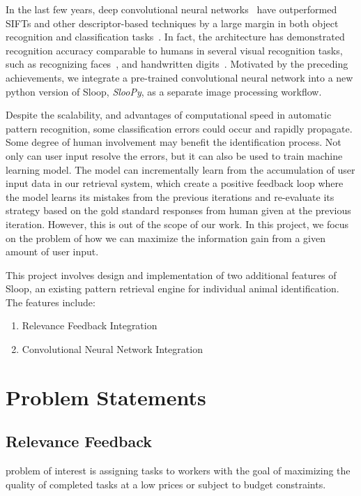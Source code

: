 In the last few years, deep convolutional neural networks~\cite{lecun95,
kriz12} have outperformed SIFTs and other descriptor-based techniques by a
large margin in both object recognition and classification tasks~\cite{kriz12,
fisher14, ILSVRC15}. In fact, the architecture has demonstrated recognition
accuracy comparable to humans in several visual recognition tasks, such as
recognizing faces~\cite{deepface14}, and handwritten digits~\cite{mnist13}.
Motivated by the preceding achievements, we integrate a pre-trained
convolutional neural network into a new python version of Sloop, \emph{SlooPy},
as a separate image processing workflow.

Despite the scalability, and advantages of computational speed in automatic
pattern recognition, some classification errors could occur and rapidly
propagate. Some degree of human involvement may benefit the identification
process. Not only can user input resolve the errors, but it can also be used to
train machine learning model. The model can incrementally learn from the
accumulation of user input data in our retrieval system, which create a
positive feedback loop where the model learns its mistakes from the previous
iterations and re-evaluate its strategy based on the gold standard responses
from human given at the previous iteration. However, this is out of the scope
of our work. In this project, we focus on the problem of how we can maximize
the information gain from a given amount of user input.

This project involves design and implementation of two additional features of
Sloop, an existing pattern retrieval engine for individual animal
identification. The features include: \begin{enumerate} \item Relevance
Feedback Integration \item Convolutional Neural Network Integration
\end{enumerate}

\section{Problem Statements}

\subsection{Relevance Feedback} %
problem of interest is assigning tasks to workers with the goal of maximizing
the quality of completed tasks at a low prices or subject to budget
constraints.

